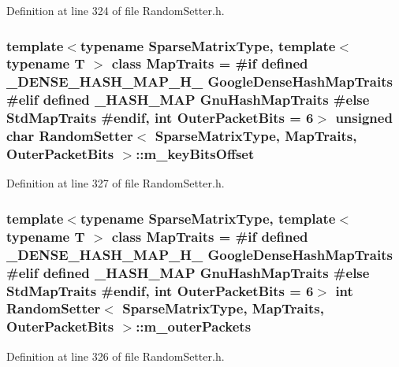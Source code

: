 Definition at line 324 of file Random\-Setter.\-h.

\hypertarget{class_random_setter_a3f86ea0a3ce0e7237cee807e2d1b6809}{
\subsubsection[{m\-\_\-key\-Bits\-Offset}]{\setlength{\rightskip}{0pt plus 5cm}template$<$typename Sparse\-Matrix\-Type, template$<$ typename T $>$ class Map\-Traits = \#if defined \-\_\-\-D\-E\-N\-S\-E\-\_\-\-H\-A\-S\-H\-\_\-\-M\-A\-P\-\_\-\-H\-\_\- Google\-Dense\-Hash\-Map\-Traits \#elif defined \-\_\-\-H\-A\-S\-H\-\_\-\-M\-A\-P Gnu\-Hash\-Map\-Traits \#else Std\-Map\-Traits \#endif, int Outer\-Packet\-Bits = 6$>$ unsigned char {\bf Random\-Setter}$<$ Sparse\-Matrix\-Type, Map\-Traits, Outer\-Packet\-Bits $>$\-::m\-\_\-key\-Bits\-Offset\hspace{0.3cm}{\ttfamily [protected]}}}\label{class_random_setter_a3f86ea0a3ce0e7237cee807e2d1b6809}


Definition at line 327 of file Random\-Setter.\-h.

\hypertarget{class_random_setter_a0b8234ec69d32ecfd49199e27e8b3646}{
\subsubsection[{m\-\_\-outer\-Packets}]{\setlength{\rightskip}{0pt plus 5cm}template$<$typename Sparse\-Matrix\-Type, template$<$ typename T $>$ class Map\-Traits = \#if defined \-\_\-\-D\-E\-N\-S\-E\-\_\-\-H\-A\-S\-H\-\_\-\-M\-A\-P\-\_\-\-H\-\_\- Google\-Dense\-Hash\-Map\-Traits \#elif defined \-\_\-\-H\-A\-S\-H\-\_\-\-M\-A\-P Gnu\-Hash\-Map\-Traits \#else Std\-Map\-Traits \#endif, int Outer\-Packet\-Bits = 6$>$ {\bf int} {\bf Random\-Setter}$<$ Sparse\-Matrix\-Type, Map\-Traits, Outer\-Packet\-Bits $>$\-::m\-\_\-outer\-Packets\hspace{0.3cm}{\ttfamily [protected]}}}\label{class_random_setter_a0b8234ec69d32ecfd49199e27e8b3646}


Definition at line 326 of file Random\-Setter.\-h.

